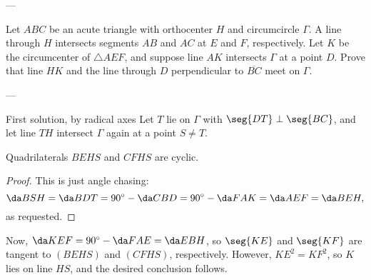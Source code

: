 
---

Let $ABC$ be an acute triangle with orthocenter $H$ and circumcircle $\Gamma$. A line through $H$ intersects segments $AB$ and $AC$ at $E$ and $F$, respectively. Let $K$ be the circumcenter of $\triangle AEF$, and suppose line $AK$ intersects $\Gamma$ at a point $D$. Prove that line $HK$ and the line through $D$ perpendicular to $\overline{BC}$ meet on $\Gamma$.

---

\begin{customenv}{First solution, by radical axes}
    Let $T$ lie on $\Gamma$ with $\seg{DT}\perp\seg{BC}$, and let line $TH$ intersect $\Gamma$ again at a point $S\ne T$.
    \begin{iclaim*}
        Quadrilaterals $BEHS$ and $CFHS$ are cyclic.
    \end{iclaim*}
    \begin{proof}
        This is just angle chasing: $$\da BSH=\da BDT=90^\circ-\da CBD=90^\circ-\da FAK=\da AEF=\da BEH,$$
        as requested.
    \end{proof}

    Now, $\da KEF=90^\circ-\da FAE=\da EBH$, so $\seg{KE}$ and $\seg{KF}$ are tangent to $(BEHS)$ and $(CFHS)$, respectively. However, $KE^2=KF^2$, so $K$ lies on line $HS$, and the desired conclusion follows. 
\end{customenv}
